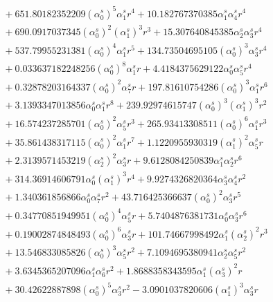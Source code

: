 \documentclass[10pt]{article}
\begin{document}
\begin{align*}
&{}  + 651.80182352209 \left(\alpha_{0}^s\right)^{5} \alpha_{1}^s r^{4} + 10.182767370385 \alpha_{1}^s \alpha_{4}^s r^{4} \\
&{}  + 690.0917037345 \left(\alpha_{0}^s\right)^{2} \left(\alpha_{1}^s\right)^{3} r^{3} + 15.307640845385 \alpha_{2}^s \alpha_{3}^s r^{4} \\
&{}  + 537.79955231381 \left(\alpha_{0}^s\right)^{4} \alpha_{1}^s r^{5} + 134.73504695105 \left(\alpha_{0}^s\right)^{3} \alpha_{3}^s r^{4} \\
&{}  + 0.033637182248256 \left(\alpha_{0}^s\right)^{8} \alpha_{1}^s r + 4.4184375629122 \alpha_{0}^s \alpha_{5}^s r^{4} \\
&{}  + 0.32878203164337 \left(\alpha_{0}^s\right)^{2} \alpha_{7}^s r + 197.81610754286 \left(\alpha_{0}^s\right)^{3} \alpha_{1}^s r^{6} \\
&{}  + 3.1393347013856 \alpha_{0}^s \alpha_{1}^s r^{8} + 239.92974615747 \left(\alpha_{0}^s\right)^{3} \left(\alpha_{1}^s\right)^{3} r^{2} \\
&{}  + 16.574237285701 \left(\alpha_{0}^s\right)^{2} \alpha_{5}^s r^{3} + 265.93413308511 \left(\alpha_{0}^s\right)^{6} \alpha_{1}^s r^{3} \\
&{}  + 35.861438317115 \left(\alpha_{0}^s\right)^{2} \alpha_{1}^s r^{7} + 1.1220955930319 \left(\alpha_{1}^s\right)^{2} \alpha_{5}^s r \\
&{}  + 2.3139571453219 \left(\alpha_{2}^s\right)^{2} \alpha_{3}^s r + 9.6128084250839 \alpha_{1}^s \alpha_{2}^s r^{6} \\
&{}  + 314.36914606791 \alpha_{0}^s \left(\alpha_{1}^s\right)^{3} r^{4} + 9.9274326820364 \alpha_{3}^s \alpha_{4}^s r^{2} \\
&{}  + 1.340361856866 \alpha_{0}^s \alpha_{7}^s r^{2} + 43.716425366637 \left(\alpha_{0}^s\right)^{2} \alpha_{3}^s r^{5} \\
&{}  + 0.34770851949951 \left(\alpha_{0}^s\right)^{4} \alpha_{5}^s r + 5.7404876381731 \alpha_{0}^s \alpha_{3}^s r^{6} \\
&{}  + 0.19002874848493 \left(\alpha_{0}^s\right)^{6} \alpha_{3}^s r + 101.74667998492 \alpha_{1}^s \left(\alpha_{2}^s\right)^{2} r^{3} \\
&{}  + 13.546833085826 \left(\alpha_{0}^s\right)^{3} \alpha_{5}^s r^{2} + 7.1094695380941 \alpha_{2}^s \alpha_{5}^s r^{2} \\
&{}  + 3.6345365207096 \alpha_{1}^s \alpha_{6}^s r^{2} + 1.8688358343595 \alpha_{1}^s \left(\alpha_{3}^s\right)^{2} r \\
&{}  + 30.42622887898 \left(\alpha_{0}^s\right)^{5} \alpha_{3}^s r^{2} - 3.0901037820606 \left(\alpha_{1}^s\right)^{3} \alpha_{3}^s r \\

\end{align*}
\end{document}
